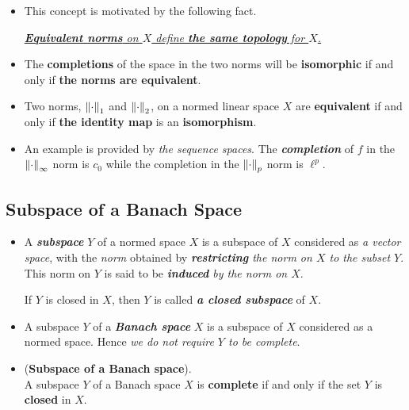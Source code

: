 \documentclass[11pt]{article}
\begin{document}
\begin{itemize}
\item \begin{remark}
This concept is motivated by the following fact. 

\underline{\emph{\textbf{Equivalent norms} on $X$ define \textbf{the same topology} for $X$.}}
\end{remark}

\item \begin{proposition}
The \textbf{completions} of the space in the two norms will be \textbf{isomorphic} if and only if \textbf{the norms are equivalent}.
\end{proposition}



\item \begin{proposition}
Two norms, $\left\|\cdot\right\|_{1}$ and $\left\|\cdot\right\|_{2}$, on a normed linear space $X$ are \textbf{equivalent} if and only if \textbf{the identity map} is an \textbf{isomorphism}.
\end{proposition}

\item \begin{remark}
An example is provided by \emph{the sequence spaces}. The \emph{\textbf{completion}} of $f$ in the $\left\|\cdot\right\|_{\infty}$ norm is $c_{0}$  while the completion in
the $\left\|\cdot\right\|_{p}$ norm is $\ell^{p}$.
\end{remark}
\end{itemize}
\subsection{Subspace of a Banach Space}
\begin{itemize}
\item \begin{definition}
A \emph{\textbf{subspace}} $Y$ of a normed space $X$ is a subspace of $X$ considered as \emph{a vector space}, with the \emph{norm} obtained by \emph{\textbf{restricting} the norm on $X$ to the subset $Y$}. This norm on $Y$ is said to be \emph{\textbf{induced} by the norm on $X$}. 

If $Y$ is closed in $X$, then $Y$ is called \emph{\textbf{a closed subspace}} of $X$.
\end{definition}

\item \begin{remark}
A subspace $Y$ of a \emph{\textbf{Banach space}} $X$ is a subspace of $X$ considered as a normed space. Hence \emph{we do not require $Y$ to be complete}. 
\end{remark}

\item \begin{proposition}(\textbf{Subspace of a Banach space}). \citep{kreyszig1989introductory} \\
 A subspace $Y$ of a Banach space $X$ is \textbf{complete} if and only if the set $Y$ is \textbf{closed} in $X$.
\end{proposition}
\end{itemize}
\end{document}
